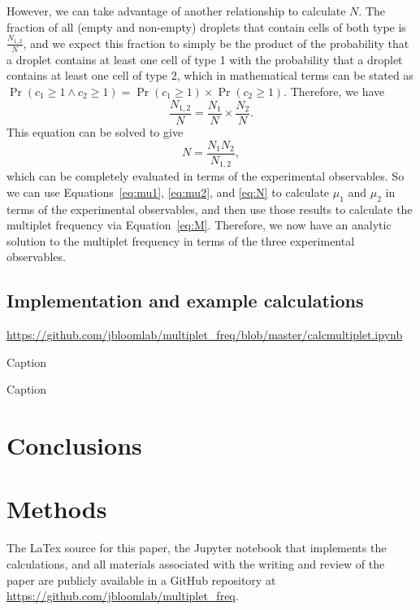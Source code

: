 \documentclass[fleqn,10pt,lineno]{wlpeerj} %
\begin{document}
However, we can take advantage of another relationship to calculate $N$.
The fraction of all (empty and non-empty) droplets that contain cells of both type is $\frac{N_{1,2}}{N}$, and we expect this fraction to simply be the product of the probability that a droplet contains at least one cell of type 1 with the probability that a droplet contains at least one cell of type 2, which in mathematical terms can be stated as $\Pr\left(c_1 \ge 1 \land c_2 \ge 1\right) = \Pr\left(c_1 \ge 1\right) \times \Pr\left(c_2 \ge 1\right)$.
Therefore, we have
\begin{equation}
\frac{N_{1,2}}{N} = \frac{N_1}{N} \times \frac{N_2}{N}.
\end{equation}
This equation can be solved to give
\begin{equation}
\label{eq:N}
N = \frac{N_1 N_2}{N_{1,2}},
\end{equation}
which can be completely evaluated in terms of the experimental observables.
So we can use Equations~\ref{eq:mu1}, \ref{eq:mu2}, and \ref{eq:N} to calculate $\mu_1$ and $\mu_2$ in terms of the experimental observables, and then use those results to calculate the multiplet frequency via Equation~\ref{eq:M}.
Therefore, we now have an analytic solution to the multiplet frequency in terms of the three experimental observables.

\subsection*{Implementation and example calculations}

\url{https://github.com/jbloomlab/multiplet_freq/blob/master/calcmultiplet.ipynb}

\begin{table}[h]
\centering

\caption{\label{tab:equal}Caption}
\end{table}

\begin{table}[h]
\centering

\caption{\label{tab:equal}Caption}
\end{table}

\section*{Conclusions}

\section*{Methods}
The LaTex source for this paper, the Jupyter notebook that implements the calculations, and all materials associated with the writing and review of the paper are publicly available in a GitHub repository at \url{https://github.com/jbloomlab/multiplet_freq}.
\end{document}
